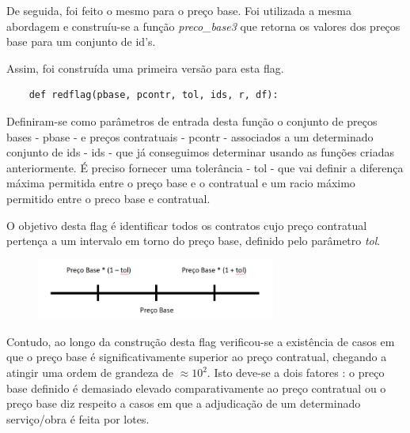De seguida, foi feito o mesmo para o preço base. Foi utilizada a mesma abordagem e construíu-se a função \textit{preco\_base3} que retorna os valores dos preços base para um conjunto de id's. 


Assim, foi construída uma primeira versão para esta flag. 

\begin{verbatim}
	def redflag(pbase, pcontr, tol, ids, r, df):
\end{verbatim}

Definiram-se como parâmetros de entrada desta função o conjunto de preços bases - pbase - e preços contratuais - pcontr - associados a um determinado conjunto de ids - ids - que já conseguimos determinar usando as funções criadas anteriormente. É preciso fornecer uma tolerância - tol - que vai definir a diferença máxima permitida entre o preço base e o contratual e um racio máximo permitido entre o preco base e contratual. 


O objetivo desta flag é identificar todos os contratos cujo preço contratual pertença a um intervalo em torno do preço base, definido pelo parâmetro \textit{tol}.

\begin{figure}[H]
	\centering
	\includegraphics[width=0.7\textwidth]{imagens/pbasecontr.png}
	\caption{}
	\label{}
\end{figure}



Contudo, ao longo da construção desta flag verificou-se a existência de casos em que o preço base é significativamente superior ao preço contratual, chegando a atingir uma ordem de grandeza de $\approx 10^2$. Isto deve-se a dois fatores : o preço base definido é demasiado elevado comparativamente ao preço contratual ou o preço base diz respeito a casos em que a adjudicação de um determinado serviço/obra é feita por lotes.

